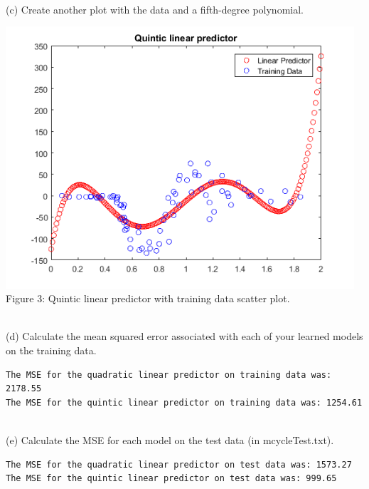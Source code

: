 \documentclass[]{report}   %
\begin{document}
~\\ 
(c) Create another plot with the data and a fifth-degree polynomial.
\begin{center}
	\includegraphics[width=35em]{2_1_Figure_3.png}
	{Figure 3: Quintic linear predictor with training data scatter plot.}
\end{center}
~\\
(d) Calculate the mean squared error associated with each of your learned models on the training
data.
\begin{lstlisting}[caption=Matlab output for MSE calculations on training data.]
The MSE for the quadratic linear predictor on training data was: 2178.55
The MSE for the quintic linear predictor on training data was: 1254.61
\end{lstlisting}
~\\
(e) Calculate the MSE for each model on the test data (in mcycleTest.txt).
\begin{lstlisting}[caption=Matlab output for MSE calculations on test data.]
The MSE for the quadratic linear predictor on test data was: 1573.27
The MSE for the quintic linear predictor on test data was: 999.65
\end{lstlisting}
\end{document}
